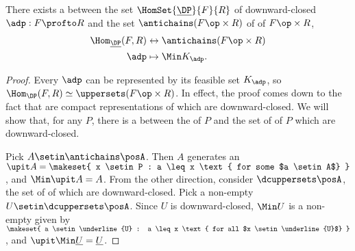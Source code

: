 \begin{lemma}
    There exists a  between the set $\HomSet{\underline{\DP}}{F}{R}$ of downward-closed  $\adp : F \profto R$ and the set $\antichains (F\op \times R)$ of  of $F\op \times R$, %
    \begin{equation}
        \begin{aligned}
            \Hom_{\underline{\DP}}(F,R) & \leftrightarrow \antichains (F\op \times R) \\
            \adp                        & \mapsto \Min K_\adp.
        \end{aligned}
    \end{equation}
\end{lemma}
\begin{proof}
    Every $\adp$ can be represented by its feasible set $K_\adp$, so $\Hom_\DP(F,R) \simeq \uppersets (F\op \times R)$.
    In effect, the proof comes down to the fact that  are compact representations of  which are downward-closed.
    We will show that, for any  $P$, there is a  between the  of $P$ and the set of  of $P$ which are downward-closed.

    Pick $A \setin \antichains\posA$.
    Then $A$ generates an  $\upit A = \makeset{ x \setin P : a \leq x \text{ for some $a \setin A$} }$, and $\Min \upit A = A$.
    From the other direction, consider $\dcuppersets \posA$, the set of  of \posA which are downward-closed.
    Pick a non-empty $U \setin \dcuppersets \posA$.
    Since $U$ is downward-closed, $\Min U$ is a non-empty  given by $\makeset{ a \setin \underline{U} : a \leq x \text{ for all $x \setin \underline{U}$} }$, and $\upit \Min \underline{U} = \underline{U}$.
\end{proof}

